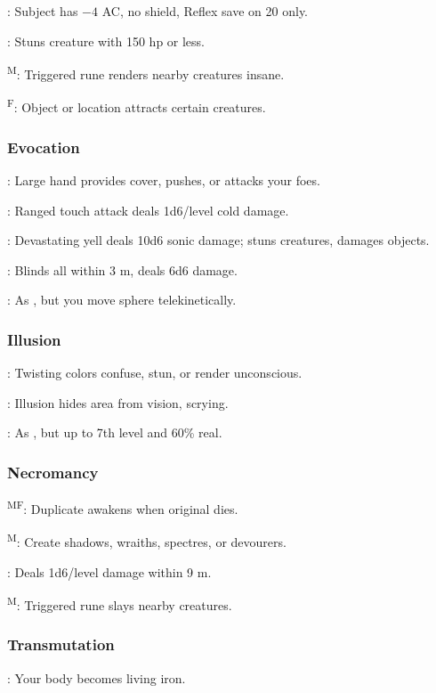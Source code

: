 	: Subject has $-4$ AC, no shield, Reflex save on 20 only.

	: Stuns creature with 150 hp or less.

	\textsuperscript{M}: Triggered rune renders nearby creatures insane.

	\textsuperscript{F}: Object or location attracts certain creatures.

\subsubsection{Evocation}
	: Large hand provides cover, pushes, or attacks your foes.

	: Ranged touch attack deals 1d6/level cold damage.

	: Devastating yell deals 10d6 sonic damage; stuns creatures, damages objects.

	: Blinds all within 3 m, deals 6d6 damage.

	: As , but you move sphere telekinetically.

\subsubsection{Illusion}
	: Twisting colors confuse, stun, or render unconscious.

	: Illusion hides area from vision, scrying.

	: As , but up to 7th level and 60\% real.

\subsubsection{Necromancy}
	\textsuperscript{MF}: Duplicate awakens when original dies.

	\textsuperscript{M}: Create shadows, wraiths, spectres, or devourers.

	: Deals 1d6/level damage within 9 m.

	\textsuperscript{M}: Triggered rune slays nearby creatures.

\subsubsection{Transmutation}
	: Your body becomes living iron.

